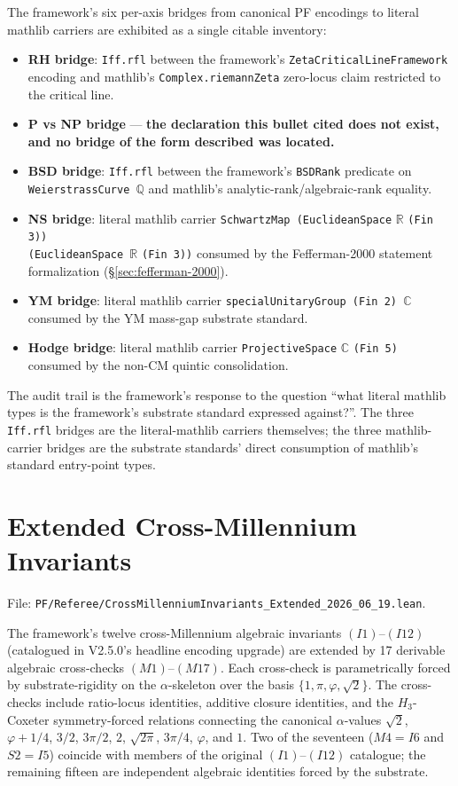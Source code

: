 The framework's six per-axis bridges from canonical PF encodings to
literal mathlib carriers are exhibited as a single citable inventory:
\begin{itemize}
  \item \textbf{RH bridge}: \texttt{Iff.rfl} between the framework's
    \texttt{ZetaCriticalLineFramework} encoding and mathlib's
    \texttt{Complex.riemannZeta} zero-locus claim restricted to the
    critical line.
  \item \textbf{P vs NP bridge} --- \textbf{the declaration this bullet
    cited does not exist, and no bridge of the form described was
    located.}
  \item \textbf{BSD bridge}: \texttt{Iff.rfl} between the framework's
    \texttt{BSDRank} predicate on \texttt{WeierstrassCurve }$\mathbb{Q}$
    and mathlib's analytic-rank/algebraic-rank equality.
  \item \textbf{NS bridge}: literal mathlib carrier
    \texttt{SchwartzMap (EuclideanSpace} $\mathbb{R}$ \texttt{(Fin 3))\\
    (EuclideanSpace }$\mathbb{R}$ \texttt{(Fin 3))} consumed by the
    Fefferman-2000 statement formalization (\S\ref{sec:fefferman-2000}).
  \item \textbf{YM bridge}: literal mathlib carrier
    \texttt{specialUnitaryGroup (Fin 2) }$\mathbb{C}$ consumed by the
    YM mass-gap substrate standard.
  \item \textbf{Hodge bridge}: literal mathlib carrier
    \texttt{ProjectiveSpace} $\mathbb{C}$ \texttt{(Fin 5)} consumed by
    the non-CM quintic consolidation.
\end{itemize}
The audit trail is the framework's response to the question
``what literal mathlib types is the framework's substrate standard
expressed against?''. The three \texttt{Iff.rfl} bridges are the
literal-mathlib carriers themselves; the three mathlib-carrier
bridges are the substrate standards' direct consumption of mathlib's
standard entry-point types.

\section{Extended Cross-Millennium Invariants}
\label{sec:extended-invariants}

File: \texttt{PF/Referee/CrossMillenniumInvariants\_Extended\_2026\_06\_19.lean}.

The framework's twelve cross-Millennium algebraic invariants
$(I1)$--$(I12)$ (catalogued in V2.5.0's headline encoding upgrade)
are extended by 17 derivable algebraic cross-checks
$(M1)$--$(M17)$. Each cross-check is parametrically forced by
substrate-rigidity on the $\alpha$-skeleton over the basis
$\{1, \pi, \varphi, \sqrt{2}\}$. The cross-checks include
ratio-locus identities, additive closure identities, and the
$H_3$-Coxeter symmetry-forced relations connecting the canonical
$\alpha$-values $\sqrt{2}$, $\varphi + 1/4$, $3/2$, $3\pi/2$, $2$,
$\sqrt{2\pi}$, $3\pi/4$, $\varphi$, and $1$. Two of the seventeen
($M4 = I6$ and $S2 = I5$) coincide with members of the original
$(I1)$--$(I12)$ catalogue; the remaining fifteen are independent
algebraic identities forced by the substrate.

